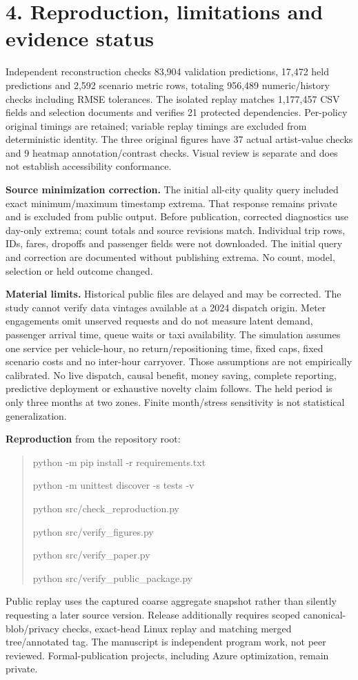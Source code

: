 \documentclass[11pt]{article}
\begin{document}
\section*{4. Reproduction, limitations and evidence status}
Independent reconstruction checks 83,904 validation predictions, 17,472 held predictions and 2,592 scenario metric rows, totaling 956,489 numeric/history checks including RMSE tolerances. The isolated replay matches 1,177,457 CSV fields and selection documents and verifies 21 protected dependencies. Per-policy original timings are retained; variable replay timings are excluded from deterministic identity. The three original figures have 37 actual artist-value checks and 9 heatmap annotation/contrast checks. Visual review is separate and does not establish accessibility conformance.

\textbf{Source minimization correction.} The initial all-city quality query included exact minimum/maximum timestamp extrema. That response remains private and is excluded from public output. Before publication, corrected diagnostics use day-only extrema; count totals and source revisions match. Individual trip rows, IDs, fares, dropoffs and passenger fields were not downloaded. The initial query and correction are documented without publishing extrema. No count, model, selection or held outcome changed.

\textbf{Material limits.} Historical public files are delayed and may be corrected. The study cannot verify data vintages available at a 2024 dispatch origin. Meter engagements omit unserved requests and do not measure latent demand, passenger arrival time, queue waits or taxi availability. The simulation assumes one service per vehicle-hour, no return/repositioning time, fixed caps, fixed scenario costs and no inter-hour carryover. Those assumptions are not empirically calibrated. No live dispatch, causal benefit, money saving, complete reporting, predictive deployment or exhaustive novelty claim follows. The held period is only three months at two zones. Finite month/stress sensitivity is not statistical generalization.

\textbf{Reproduction} from the repository root:
\begin{quote}\small\ttfamily
python -m pip install -r requirements.txt\par
python -m unittest discover -s tests -v\par
python src/check\_reproduction.py\par
python src/verify\_figures.py\par
python src/verify\_paper.py\par
python src/verify\_public\_package.py
\end{quote}
Public replay uses the captured coarse aggregate snapshot rather than silently requesting a later source version. Release additionally requires scoped canonical-blob/privacy checks, exact-head Linux replay and matching merged tree/annotated tag. The manuscript is independent program work, not peer reviewed. Formal-publication projects, including Azure optimization, remain private.
\end{document}

